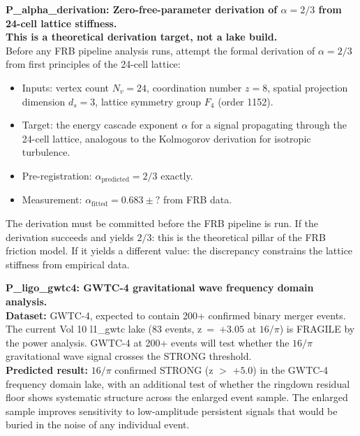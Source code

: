 \documentclass[11pt, letterpaper, openany]{book}
\begin{document}
\begin{predictionbox}
\textbf{P\_alpha\_derivation: Zero-free-parameter derivation of $\alpha = 2/3$
from 24-cell lattice stiffness.}\\[0.5em]
\textbf{This is a theoretical derivation target, not a lake build.}\\[0.5em]
Before any FRB pipeline analysis runs, attempt the formal derivation of
$\alpha = 2/3$ from first principles of the 24-cell lattice:
\begin{itemize}
    \item Inputs: vertex count $N_v = 24$, coordination number $z = 8$,
    spatial projection dimension $d_s = 3$, lattice symmetry group
    $F_4$ (order 1152).
    \item Target: the energy cascade exponent $\alpha$ for a signal
    propagating through the 24-cell lattice, analogous to the Kolmogorov
    derivation for isotropic turbulence.
    \item Pre-registration: $\alpha_\text{predicted} = 2/3$ exactly.
    \item Measurement: $\alpha_\text{fitted} = 0.683 \pm ?$ from FRB data.
\end{itemize}
The derivation must be committed before the FRB pipeline is run.
If the derivation succeeds and yields $2/3$: this is the theoretical
pillar of the FRB friction model. If it yields a different value:
the discrepancy constrains the lattice stiffness from empirical data.
\end{predictionbox}

\begin{predictionbox}
\textbf{P\_ligo\_gwtc4: GWTC-4 gravitational wave frequency domain analysis.}\\[0.5em]
\textbf{Dataset:} GWTC-4, expected to contain 200+ confirmed binary merger
events. The current Vol 10 l1\_gwtc lake (83 events, z~=~$+3.05$ at $16/\pi$)
is FRAGILE by the power analysis. GWTC-4 at 200+ events will test whether
the $16/\pi$ gravitational wave signal crosses the STRONG threshold.\\[0.5em]
\textbf{Predicted result:} $16/\pi$ confirmed STRONG (z $>$ $+5.0$) in the
GWTC-4 frequency domain lake, with an additional test of whether the
ringdown residual floor shows systematic structure across the enlarged
event sample. The enlarged sample improves sensitivity to low-amplitude
persistent signals that would be buried in the noise of any individual event.
\end{predictionbox}
\end{document}
